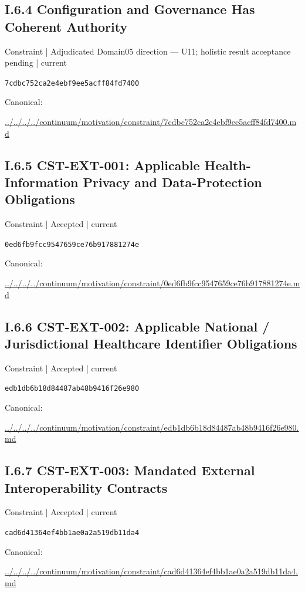 \documentclass[10pt,a4paper]{article}
\begin{document}
\subsection*{I.6.4 Configuration and Governance Has Coherent Authority}
{\small Constraint | Adjudicated Domain05 direction — U11; holistic result acceptance pending | current}\par
\texttt{7cdbc752ca2e4ebf9ee5acff84fd7400}\par
Canonical: \par
{\footnotesize\url{../../../../continuum/motivation/constraint/7cdbc752ca2e4ebf9ee5acff84fd7400.md}}\par
\subsection*{I.6.5 CST-EXT-001: Applicable Health-Information Privacy and Data-Protection Obligations}
{\small Constraint | Accepted | current}\par
\texttt{0ed6fb9fcc9547659ce76b917881274e}\par
Canonical: \par
{\footnotesize\url{../../../../continuum/motivation/constraint/0ed6fb9fcc9547659ce76b917881274e.md}}\par
\subsection*{I.6.6 CST-EXT-002: Applicable National / Jurisdictional Healthcare Identifier Obligations}
{\small Constraint | Accepted | current}\par
\texttt{edb1db6b18d84487ab48b9416f26e980}\par
Canonical: \par
{\footnotesize\url{../../../../continuum/motivation/constraint/edb1db6b18d84487ab48b9416f26e980.md}}\par
\subsection*{I.6.7 CST-EXT-003: Mandated External Interoperability Contracts}
{\small Constraint | Accepted | current}\par
\texttt{cad6d41364ef4bb1ae0a2a519db11da4}\par
Canonical: \par
{\footnotesize\url{../../../../continuum/motivation/constraint/cad6d41364ef4bb1ae0a2a519db11da4.md}}\par
\end{document}

